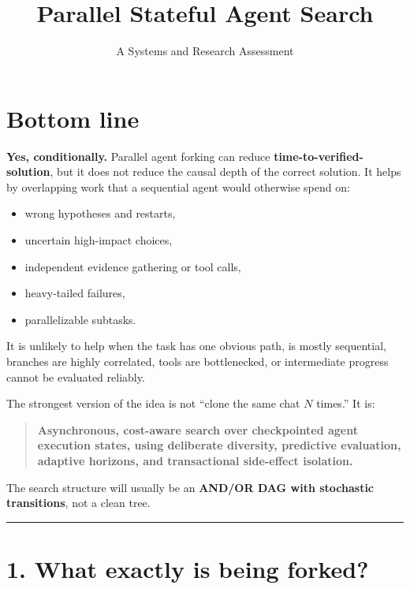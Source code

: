 \documentclass[
  letterpaper,
]{article}
\title{Parallel Stateful Agent Search}
\subtitle{A Systems and Research Assessment}
\author{}
\date{}
\providecommand{\tightlist}{%
  \setlength{\itemsep}{0pt}\setlength{\parskip}{0pt}}
\begin{document}
\maketitle

{
\setcounter{tocdepth}{3}
\tableofcontents
}
\section{Bottom line}\label{bottom-line}

\textbf{Yes, conditionally.} Parallel agent forking can reduce \textbf{time-to-verified-solution}, but it does not reduce the causal depth of the correct solution. It helps by overlapping work that a sequential agent would otherwise spend on:

\begin{itemize}
\tightlist
\item
  wrong hypotheses and restarts,
\item
  uncertain high-impact choices,
\item
  independent evidence gathering or tool calls,
\item
  heavy-tailed failures,
\item
  parallelizable subtasks.
\end{itemize}

It is unlikely to help when the task has one obvious path, is mostly sequential, branches are highly correlated, tools are bottlenecked, or intermediate progress cannot be evaluated reliably.

The strongest version of the idea is not ``clone the same chat \(N\) times.'' It is:

\begin{quote}
\textbf{Asynchronous, cost-aware search over checkpointed agent execution states, using deliberate diversity, predictive evaluation, adaptive horizons, and transactional side-effect isolation.}
\end{quote}

The search structure will usually be an \textbf{AND/OR DAG with stochastic transitions}, not a clean tree.

\begin{center}\rule{0.5\linewidth}{0.5pt}\end{center}

\section{1. What exactly is being forked?}\label{what-exactly-is-being-forked}
\end{document}
